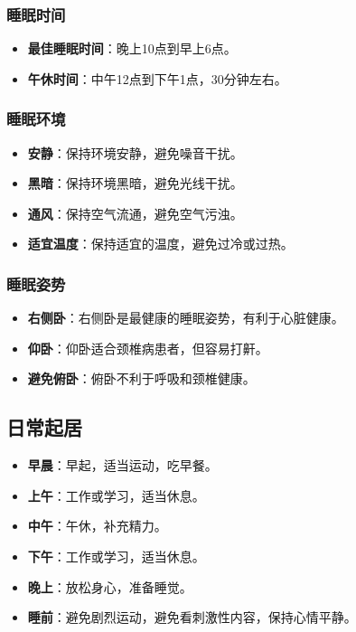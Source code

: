 \documentclass[12pt,UTF8]{ctexbook}
\begin{document}
\subsubsection{睡眠时间}

\begin{itemize}
\item \textbf{最佳睡眠时间}：晚上10点到早上6点。
\item \textbf{午休时间}：中午12点到下午1点，30分钟左右。
\end{itemize}

\subsubsection{睡眠环境}

\begin{itemize}
\item \textbf{安静}：保持环境安静，避免噪音干扰。
\item \textbf{黑暗}：保持环境黑暗，避免光线干扰。
\item \textbf{通风}：保持空气流通，避免空气污浊。
\item \textbf{适宜温度}：保持适宜的温度，避免过冷或过热。
\end{itemize}

\subsubsection{睡眠姿势}

\begin{itemize}
\item \textbf{右侧卧}：右侧卧是最健康的睡眠姿势，有利于心脏健康。
\item \textbf{仰卧}：仰卧适合颈椎病患者，但容易打鼾。
\item \textbf{避免俯卧}：俯卧不利于呼吸和颈椎健康。
\end{itemize}

\subsection{日常起居}

\begin{itemize}
\item \textbf{早晨}：早起，适当运动，吃早餐。
\item \textbf{上午}：工作或学习，适当休息。
\item \textbf{中午}：午休，补充精力。
\item \textbf{下午}：工作或学习，适当休息。
\item \textbf{晚上}：放松身心，准备睡觉。
\item \textbf{睡前}：避免剧烈运动，避免看刺激性内容，保持心情平静。
\end{itemize}
\end{document}
